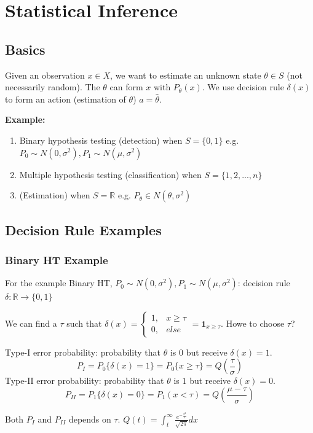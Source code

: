 \documentclass[11pt]{elegantbook}
\begin{document}
\chapter{Statistical Inference}

\section{Basics}
Given an observation $x\in X$, we want to estimate an unknown state $\theta \in S$ (not necessarily random). The $\theta$ can form $x$ with $P_\theta(x)$. We use decision rule $\delta (x)$ to form an action (estimation of $\theta$) $a=\hat{\theta}$.

\textbf{Example:}
\begin{enumerate}[(1)]
    \item Binary hypothesis testing (detection) when $S=\{0,1\}$ e.g. $P_0\sim N(0,\sigma^2), P_1\sim N(\mu,\sigma^2)$
    \item Multiple hypothesis testing (classification) when $S=\{1,2,...,n\}$
    \item (Estimation) when $S=\mathbb{R}$ e.g. $P_\theta\in N(\theta,\sigma^2)$
\end{enumerate}

\section{Decision Rule Examples}
\subsection*{Binary HT Example}
For the example Binary HT, $P_0\sim N(0,\sigma^2), P_1\sim N(\mu,\sigma^2)$: decision rule $\delta: \mathbb{R} \rightarrow \{0,1\}$

We can find a $\tau$ such that $\delta(x)=\left\{\begin{matrix}
    1,&x\ge \tau\\
    0,& else
\end{matrix}\right.=\mathbf{1}_{x\geq \tau}$. Howe to choose $\tau$?

Type-I error probability: probability that $\theta$ is $0$ but receive $\delta(x)=1$. $$P_I=P_0\{\delta(x)=1\}=P_0\{x\geq \tau\}=Q\left(\frac{\tau}{\sigma}\right)$$
Type-II error probability: probability that $\theta$ is $1$ but receive $\delta(x)=0$. $$P_{II}=P_1\{\delta(x)=0\}=P_1(x<\tau)=Q(\frac{\mu-\tau}{\sigma})$$

Both $P_I$ and $P_{II}$ depends on $\tau$. $Q(t)=\int_t^\infty\frac{e^{-\frac{x^2}{2}}}{\sqrt{2\pi}}dx$
\end{document}
